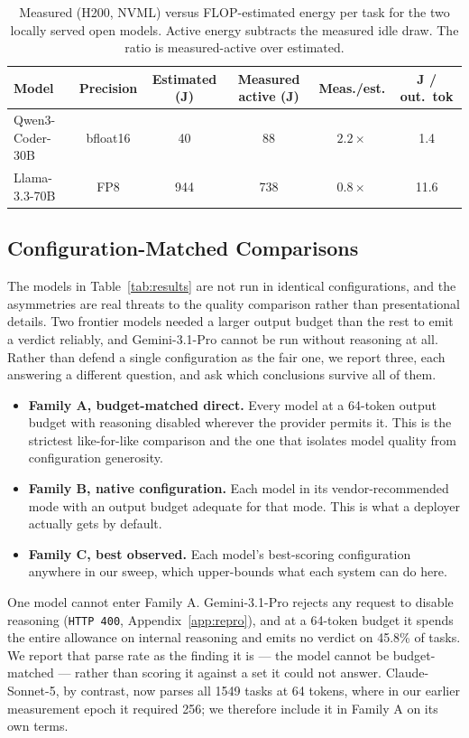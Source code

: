 \documentclass[computers,article,submit,moreauthors]{Definitions/mdpi}
\begin{document}
\begin{table}[H]
\caption{Measured (H200, NVML) versus FLOP-estimated energy per task for the two locally served open models. Active energy subtracts the measured idle draw. The ratio is measured-active over estimated.\label{tab:energy-validation}}
\begin{tabularx}{\textwidth}{lCCCCC}
\toprule
\textbf{Model} & \textbf{Precision} & \textbf{Estimated (J)} & \textbf{Measured active (J)} & \textbf{Meas./est.} & \textbf{J / out.\ tok}\\
\midrule
Qwen3-Coder-30B & bfloat16 & 40 & 88 & $2.2\times$ & 1.4\\
Llama-3.3-70B & FP8 & 944 & 738 & $0.8\times$ & 11.6\\
\bottomrule
\end{tabularx}
\end{table}

\subsection{Configuration-Matched Comparisons}\label{sec:families}
The models in Table~\ref{tab:results} are not run in identical configurations, and the asymmetries are real threats to the quality comparison rather than presentational details. Two frontier models needed a larger output budget than the rest to emit a verdict reliably, and Gemini-3.1-Pro cannot be run without reasoning at all. Rather than defend a single configuration as the fair one, we report three, each answering a different question, and ask which conclusions survive all of them.

\begin{itemize}
\item \textbf{Family A, budget-matched direct.} Every model at a 64-token output budget with reasoning disabled wherever the provider permits it. This is the strictest like-for-like comparison and the one that isolates model quality from configuration generosity.
\item \textbf{Family B, native configuration.} Each model in its vendor-recommended mode with an output budget adequate for that mode. This is what a deployer actually gets by default.
\item \textbf{Family C, best observed.} Each model's best-scoring configuration anywhere in our sweep, which upper-bounds what each system can do here.
\end{itemize}

One model cannot enter Family A. Gemini-3.1-Pro rejects any request to disable reasoning (\texttt{HTTP 400}, Appendix~\ref{app:repro}), and at a 64-token budget it spends the entire allowance on internal reasoning and emits no verdict on 45.8\% of tasks. We report that parse rate as the finding it is --- the model cannot be budget-matched --- rather than scoring it against a set it could not answer. Claude-Sonnet-5, by contrast, now parses all 1549 tasks at 64 tokens, where in our earlier measurement epoch it required 256; we therefore include it in Family A on its own terms.
\end{document}
